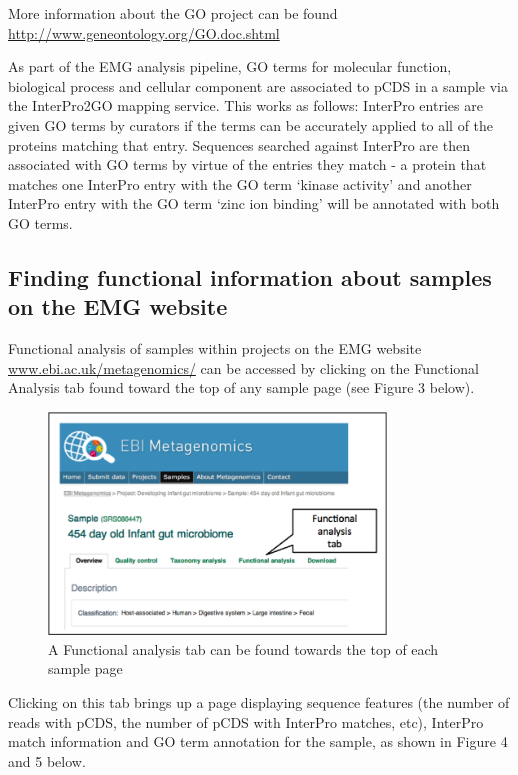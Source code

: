 More information about the GO project can be found \url{http://www.geneontology.org/GO.doc.shtml}

As part of the EMG analysis pipeline, GO terms for molecular function, biological process and cellular component are associated to pCDS in a sample via the InterPro2GO mapping service. This works as follows: InterPro entries are given GO terms by curators if the terms can be accurately applied to all of the proteins matching that entry. Sequences searched against InterPro are then associated with GO terms by virtue of the entries they match - a protein that matches one InterPro entry with the GO term ‘kinase activity’ and another InterPro entry with the GO term ‘zinc ion binding’ will be annotated with both GO terms.

\subsection{Finding functional information about samples on the EMG website}

Functional analysis of samples within projects on the EMG website \url{www.ebi.ac.uk/metagenomics/} can be accessed by clicking on the Functional Analysis tab found toward the top of any sample page (see Figure 3 below).

\begin{figure}[H]
\centering
\includegraphics[width=0.8\textwidth]{handout/FA.png}
\caption{A Functional analysis tab can be found towards the top of each sample page}
\label{fig:FA}
\end{figure}

Clicking on this tab brings up a page displaying sequence features (the number of reads with pCDS, the number of pCDS with InterPro matches, etc), InterPro match information and GO term annotation for the sample, as shown in Figure 4 and 5 below.


